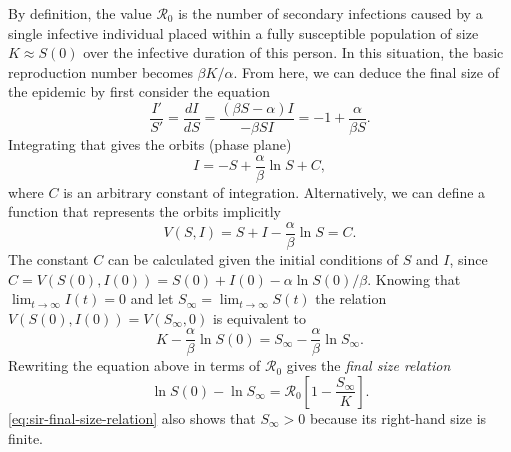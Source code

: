 By definition, the value $\mathcal{R}_0$ is the number of secondary infections caused by a single infective individual placed within a fully susceptible population of size $K \approx S(0)$ over the infective duration of this person.
In this situation, the basic reproduction number becomes $\beta K / \alpha$.
From here, we can deduce the final size of the epidemic by first consider the equation
\begin{equation*}
    \frac{I'}{S'} = \frac{dI}{dS} = \frac{(\beta S - \alpha) I}{- \beta S I} = -1 + \frac{\alpha}{\beta S}.
\end{equation*}
Integrating that gives the orbits (phase plane)
\begin{equation}
    I = -S + \frac{\alpha}{\beta} \ln S + C,
    \label{eq:sir-I-wrt-S-orbits}
\end{equation}
where $C$ is an arbitrary constant of integration.
Alternatively, we can define a function that represents the orbits implicitly
\begin{equation*}
    V(S, I) = S + I - \frac{\alpha}{\beta} \ln S = C.
\end{equation*}
The constant $C$ can be calculated given the initial conditions of $S$ and $I$, since $C = V(S(0), I(0)) = S(0) + I(0) - \alpha \ln S(0) / \beta$.
Knowing that $\lim_{t \to \infty} I(t) = 0$ and let $S_\infty = \lim_{t \to \infty} S(t)$ the relation $V(S(0), I(0)) = V(S_\infty, 0)$ is equivalent to
\begin{equation*}
    K - \frac{\alpha}{\beta} \ln S(0) = S_\infty - \frac{\alpha}{\beta} \ln S_\infty.
\end{equation*}
Rewriting the equation above in terms of $\mathcal{R}_0$ gives the \textit{final size relation}
\begin{equation}
    \ln S(0) - \ln S_\infty = \mathcal{R}_0 \left[ 1 - \frac{S_\infty}{K} \right].
    \label{eq:sir-final-size-relation}
\end{equation}
\autoref{eq:sir-final-size-relation} also shows that $S_\infty > 0$ because its right-hand size is finite.

